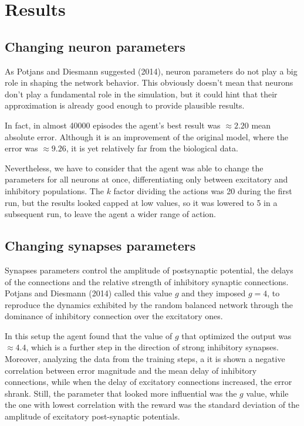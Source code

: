 \section{Results}

\subsection{Changing neuron parameters} 

As Potjans and Diesmann suggested (2014), neuron parameters do not play a big role in shaping the network behavior. This obviously doesn't mean that neurons don't play a fundamental role in the simulation, but it could hint that their approximation is already good enough to provide plausible results. 

In fact, in almost 40000 episodes the agent's best result was $\approx 2.20$ mean absolute error. Although it is an improvement of the original model, where the error was $\approx 9.26$, it is yet relatively far from the biological data.

Nevertheless, we have to consider that the agent was able to change the parameters for all neurons at once, differentiating only between excitatory and inhibitory populations. The $k$ factor dividing the actions was 20 during the first run, but the results looked capped at low values, so it was lowered to 5 in a subsequent run, to leave the agent a wider range of action.

\subsection{Changing synapses parameters} 

Synapses parameters control the amplitude of postsynaptic potential, the delays of the connections and the relative strength of inhibitory synaptic connections. Potjans and Diesmann (2014) called this value $g$ and they imposed $g = 4$, to reproduce the dynamics exhibited by the random balanced network through the dominance of inhibitory connection over the excitatory ones.

In this setup the agent found that the value of $g$ that optimized the output was $\approx 4.4$, which is a further step in the direction of strong inhibitory synapses. Moreover, analyzing the data from the training steps, a it is shown a negative correlation between error magnitude and the mean delay of inhibitory connections, while when the delay of excitatory connections increased, the error shrank. Still, the parameter that looked more influential was the $g$ value, while the one with lowest correlation with the reward was the standard deviation of the amplitude of excitatory post-synaptic potentials. 

